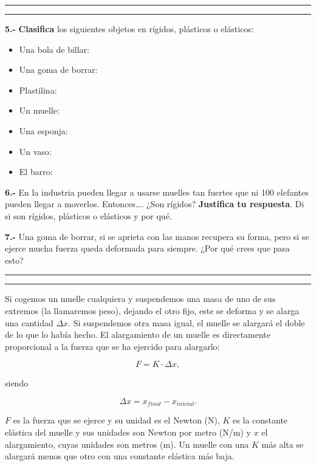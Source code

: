 \documentclass[
  letterpaper,
  DIV=11,
  numbers=noendperiod]{scrreprt}
\begin{document}
\begin{center}\rule{0.5\linewidth}{0.5pt}\end{center}

\begin{center}\rule{0.5\linewidth}{0.5pt}\end{center}

\textbf{5.-} \textbf{Clasifica} los siguientes objetos en rígidos,
plásticos o elásticos:

\begin{itemize}
\item
  Una bola de billar:
\item
  Una goma de borrar:
\item
  Plastilina:
\item
  Un muelle:
\item
  Una esponja:
\item
  Un vaso:
\item
  El barro:
\end{itemize}

\textbf{6.-} En la industria pueden llegar a usarse muelles tan fuertes
que ni 100 elefantes pueden llegar a moverlos. Entonces\ldots. ¿Son
rígidos? \textbf{Justifica tu respuesta}. Di si son rígidos, plásticos o
elásticos y por qué.

\textbf{7.-} Una goma de borrar, si se aprieta con las manos recupera su
forma, pero si se ejerce mucha fuerza queda deformada para siempre. ¿Por
qué crees que pasa esto?

\begin{center}\rule{0.5\linewidth}{0.5pt}\end{center}

\begin{center}\rule{0.5\linewidth}{0.5pt}\end{center}

Si cogemos un muelle cualquiera y suspendemos una masa de uno de sus
extremos (la llamaremos peso), dejando el otro fijo, este se deforma y
se alarga una cantidad \(\Delta x\). Si suspendemos otra masa igual, el
muelle se alargará el doble de lo que lo había hecho. El alargamiento de
un muelle es directamente proporcional a la fuerza que se ha ejercido
para alargarlo:

\[
F = K \cdot \Delta x,
\]

siendo

\[
\Delta x = x_{final} - x_{inicial}.
\]

\(F\) es la fuerza que se ejerce y su unidad es el Newton (N), \(K\) es
la constante elástica del muelle y sus unidades son Newton por metro
(N/m) y \(x\) el alargamiento, cuyas unidades son metros (m). Un muelle
con una \(K\) más alta se alargará menos que otro con una constante
elástica más baja.
\end{document}
